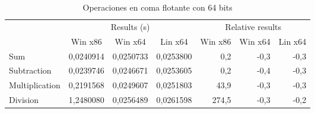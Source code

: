 \begin{table}[h]
\centering
\begin{tabular}{@{}l|rrr|rrr|@{}}
\cmidrule(l){2-7}
                                     & \multicolumn{3}{c|}{Results (s)}                                                               & \multicolumn{3}{c|}{Relative results}                                                      \\ \cmidrule(l){2-7} 
                                     & \multicolumn{1}{c|}{Win x86} & \multicolumn{1}{c|}{Win x64} & \multicolumn{1}{c|}{Lin x64} & \multicolumn{1}{c|}{Win x86} & \multicolumn{1}{c|}{Win x64} & \multicolumn{1}{c|}{Lin x64} \\ \midrule
\multicolumn{1}{|l|}{Sum}            & 0,0240914                    & 0,0250733                    & 0,0253800                    & 0,2                          & -0,3                         & -0,3                         \\ \cmidrule(r){1-1}
\multicolumn{1}{|l|}{Subtraction}    & 0,0239746                    & 0,0246671                    & 0,0253605                    & 0,2                          & -0,4                         & -0,3                         \\ \cmidrule(r){1-1}
\multicolumn{1}{|l|}{Multiplication} & 0,2191568                    & 0,0249607                    & 0,0251803                    & 43,9                         & -0,3                         & -0,3                         \\ \cmidrule(r){1-1}
\multicolumn{1}{|l|}{Division}       & 1,2480080                    & 0,0256489                    & 0,0261598                    & 274,5                        & -0,3                         & -0,2                         \\ \bottomrule
\end{tabular}
\caption{Operaciones en coma flotante con 64 bits}
\end{table}

